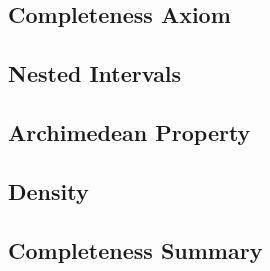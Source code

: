 \subsection*{Completeness Axiom}


\subsection*{Nested Intervals}


\subsection*{Archimedean Property}


\subsection*{Density}


\subsection*{Completeness Summary}

